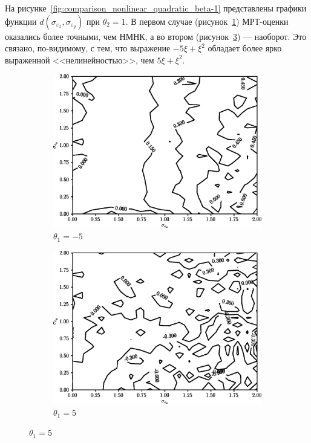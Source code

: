 На рисунке~\ref{fig:comparison_nonlinear_quadratic_beta-1}
представлены графики функции \( d(\sigma_{\varepsilon_x}, \sigma_{\varepsilon_y}) \)
при \( \theta_2 = 1 \).
В первом случае (рисунок~\ref{fig:comparison_nonlinear_quadratic_alpha--5_beta-1})
МРТ-оценки оказались более точными, чем НМНК, а во втором
(рисунок~\ref{fig:comparison_nonlinear_quadratic_alpha-5_beta-1}) --- наоборот.
Это связано, по-видимому, с тем, что выражение \( -5 \xi + \xi^2 \)
обладает более ярко выраженной <<нелинейностью>>, чем \( 5 \xi + \xi^2 \).

\begin{figure}[p]
  \begin{subfigure}[b]{\linewidth}
    \centering
    \includegraphics[width=135mm]{fig/nonlinear/quadratic/alpha--5_beta-1.png}
    \caption{\( \theta_1 = -5 \)}\label{fig:comparison_nonlinear_quadratic_alpha--5_beta-1}
  \end{subfigure}

  \vspace{2\baselineskip}
  \begin{subfigure}[b]{\linewidth}
    \centering
    \includegraphics[width=135mm]{fig/nonlinear/quadratic/alpha-5_beta-1.png}
    \caption{\( \theta_1 = 5 \)}\label{fig:comparison_nonlinear_quadratic_alpha-5_beta-1}
  \end{subfigure}


\end{figure}
